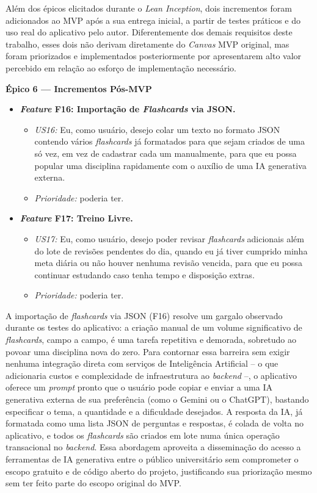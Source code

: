Além dos épicos elicitados durante o \textit{Lean Inception}, dois incrementos foram adicionados ao MVP após a sua entrega inicial, a partir de testes práticos e do uso real do aplicativo pelo autor.
Diferentemente dos demais requisitos deste trabalho, esses dois não derivam diretamente do \textit{Canvas} MVP original, mas foram priorizados e implementados posteriormente por apresentarem alto valor percebido em relação ao esforço de implementação necessário.

\textbf{Épico 6 --- Incrementos Pós-MVP}

\begin{itemize}
    \item \textbf{\textit{Feature} F16: Importação de \textit{Flashcards} via JSON.}
    \begin{itemize}
        \item \textit{US16:} Eu, como usuário, desejo colar um texto no formato JSON contendo vários \textit{flashcards} já formatados para que sejam criados de uma só vez, em vez de cadastrar cada um manualmente, para que eu possa popular uma disciplina rapidamente com o auxílio de uma IA generativa externa.
        \item \textit{Prioridade:} poderia ter.
    \end{itemize}
    \item \textbf{\textit{Feature} F17: Treino Livre.}
    \begin{itemize}
        \item \textit{US17:} Eu, como usuário, desejo poder revisar \textit{flashcards} adicionais além do lote de revisões pendentes do dia, quando eu já tiver cumprido minha meta diária ou não houver nenhuma revisão vencida, para que eu possa continuar estudando caso tenha tempo e disposição extras.
        \item \textit{Prioridade:} poderia ter.
    \end{itemize}
\end{itemize}

A importação de \textit{flashcards} via JSON (F16) resolve um gargalo observado durante os testes do aplicativo: a criação manual de um volume significativo de \textit{flashcards}, campo a campo, é uma tarefa repetitiva e demorada, sobretudo ao povoar uma disciplina nova do zero.
Para contornar essa barreira sem exigir nenhuma integração direta com serviços de Inteligência Artificial -- o que adicionaria custos e complexidade de infraestrutura ao \textit{backend} --, o aplicativo oferece um \textit{prompt} pronto que o usuário pode copiar e enviar a uma IA generativa externa de sua preferência (como o Gemini ou o ChatGPT), bastando especificar o tema, a quantidade e a dificuldade desejados.
A resposta da IA, já formatada como uma lista JSON de perguntas e respostas, é colada de volta no aplicativo, e todos os \textit{flashcards} são criados em lote numa única operação transacional no \textit{backend}.
Essa abordagem aproveita a disseminação do acesso a ferramentas de IA generativa entre o público universitário sem comprometer o escopo gratuito e de código aberto do projeto, justificando sua priorização mesmo sem ter feito parte do escopo original do MVP.

